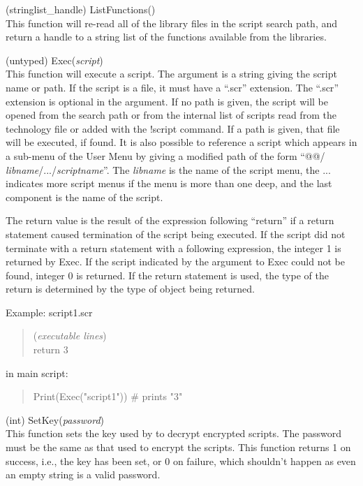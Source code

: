 \begin{description}
\item{(stringlist\_handle) \vt ListFunctions()}\\
This function will re-read all of the {\vt library} files in the
script search path, and return a handle to a string list of the
functions available from the libraries.

\item{(untyped) \vt Exec({\it script\/})}\\
This function will execute a script.  The argument is a string giving
the script name or path.  If the script is a file, it must have a
``{\vt .scr}'' extension.  The ``{\vt .scr}'' extension is optional in
the argument.  If no path is given, the script will be opened from the
search path or from the internal list of scripts read from the
technology file or added with the {\cb !script} command.  If a path is
given, that file will be executed, if found.  It is also possible to
reference a script which appears in a sub-menu of the {\cb User Menu}
by giving a modified path of the form ``{\vt @@/{\it
libname}/.../{\it scriptname}}''.  The {\it libname} is the name of
the script menu, the ...  indicates more script menus if the menu is
more than one deep, and the last component is the name of the script. 

The return value is the result of the expression following ``return''
if a {\vt return} statement caused termination of the script being
executed.  If the script did not terminate with a {\vt return}
statement with a following expression, the integer 1 is returned by
{\vt Exec}.  If the script indicated by the argument to {\vt Exec}
could not be found, integer 0 is returned.  If the {\vt return}
statement is used, the type of the return is determined by the type of
object being returned.

Example:  script1.scr
\begin{quote}
({\it executable lines\/})\\
{\vt return 3}
\end{quote}
in main script:
\begin{quote}
{\vt Print(Exec("script1"))    \# prints "3"}
\end{quote}

\item{(int) \vt SetKey({\it password\/})}\\
This function sets the key used by {\Xic} to decrypt encrypted
scripts.  The password must be the same as that used to encrypt the
scripts.  This function returns 1 on success, i.e., the key has been
set, or 0 on failure, which shouldn't happen as even an empty string
is a valid password.


\end{description}
